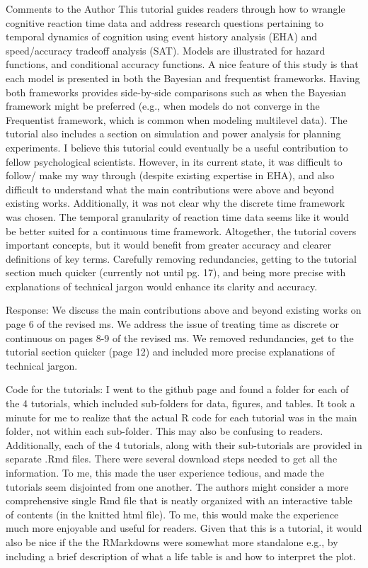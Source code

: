 \documentclass[
]{article}
\renewenvironment{quote}{\begin{leftbar}}{\end{leftbar}}
\begin{document}
\begin{quote}
Comments to the Author This tutorial guides readers through how to
wrangle cognitive reaction time data and address research questions
pertaining to temporal dynamics of cognition using event history
analysis (EHA) and speed/accuracy tradeoff analysis (SAT). Models are
illustrated for hazard functions, and conditional accuracy functions. A
nice feature of this study is that each model is presented in both the
Bayesian and frequentist frameworks. Having both frameworks provides
side-by-side comparisons such as when the Bayesian framework might be
preferred (e.g., when models do not converge in the Frequentist
framework, which is common when modeling multilevel data). The tutorial
also includes a section on simulation and power analysis for planning
experiments. I believe this tutorial could eventually be a useful
contribution to fellow psychological scientists. However, in its current
state, it was difficult to follow/ make my way through (despite existing
expertise in EHA), and also difficult to understand what the main
contributions were above and beyond existing works. Additionally, it was
not clear why the discrete time framework was chosen. The temporal
granularity of reaction time data seems like it would be better suited
for a continuous time framework. Altogether, the tutorial covers
important concepts, but it would benefit from greater accuracy and
clearer definitions of key terms. Carefully removing redundancies,
getting to the tutorial section much quicker (currently not until pg.
17), and being more precise with explanations of technical jargon would
enhance its clarity and accuracy.
\end{quote}

Response: We discuss the main contributions above and beyond existing
works on page 6 of the revised ms. We address the issue of treating time
as discrete or continuous on pages 8-9 of the revised ms. We removed
redundancies, get to the tutorial section quicker (page 12) and included
more precise explanations of technical jargon.

\begin{quote}
Code for the tutorials: I went to the github page and found a folder for
each of the 4 tutorials, which included sub-folders for data, figures,
and tables. It took a minute for me to realize that the actual R code
for each tutorial was in the main folder, not within each sub-folder.
This may also be confusing to readers. Additionally, each of the 4
tutorials, along with their sub-tutorials are provided in separate .Rmd
files. There were several download steps needed to get all the
information. To me, this made the user experience tedious, and made the
tutorials seem disjointed from one another. The authors might consider a
more comprehensive single Rmd file that is neatly organized with an
interactive table of contents (in the knitted html file). To me, this
would make the experience much more enjoyable and useful for readers.
Given that this is a tutorial, it would also be nice if the the
RMarkdowns were somewhat more standalone e.g., by including a brief
description of what a life table is and how to interpret the plot.
\end{quote}
\end{document}
